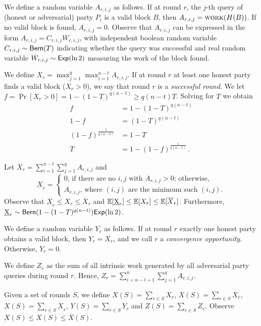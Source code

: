 We define a random variable $A_{r, i, j}$ as follows.
If at round $r$, the $j$-th query of (honest or adversarial) party $P_i$ is a valid block $B$,
then $A_{r, i, j} = \textsc{work}(H(B))$.
If no valid block is found, $A_{r, i, j} = 0$.
Observe that $A_{r, i, j}$ can be expressed in the form $A_{r, i, j} = C_{r, i, j} W_{r, i, j}$,
with independent boolean random variable $C_{r, i, j} \sim \textsf{Bern}(T)$ indicating whether the query was successful
and real random variable $W_{r, i, j} \sim \textsf{Exp}(\ln2)$ measuring the work of the block found.

We define $X_{r} = \max_{j=1}^q \max_{i = 1}^{n - t} A_{r, i, j}$.
If at round $r$ at least one honest party finds a valid block ($X_r > 0$),
we say that round $r$ is a \emph{successful round}.
We let $f = \Pr[X_r > 0] = 1 - (1 - T)^{q(n - t)} \geq q(n - t)T$.
Solving for $T$ we obtain
\begin{align*}
  f &= 1 - (1 - T)^{q(n - t)}\\
  1 - f &= (1 - T)^{q(n - t)}\\
  (1 - f)^{\frac{1}{q(n - t)}} &= 1 - T\\
  T &= 1 - (1 - f)^{\frac{1}{q(n - t)}}\,.
\end{align*}

Let $\overline{X}_r = \sum_{i = 1}^{n - t} \sum_{j = 1}^q A_{r,i,j}$ and
\[
  \underbar{X}_r = \begin{cases}
  0 \text{, if there are no $i, j$ with $A_{r,i,j} > 0$; otherwise,}\\
  A_{r,i,j} \text{, where $(i, j)$ are the minimum such $(i, j)$.}
\end{cases}\]
Observe that $\underbar{X}_r \leq X_r \leq \overline{X}_r$
and $\mathop{{}\mathbb{E}}[\underbar{X}_r] \leq \mathop{{}\mathbb{E}}[X_r] \leq \mathop{{}\mathbb{E}}[\overline{X}_r]$.
Furthermore, $\underbar{X}_r \sim \textsf{Bern}(1 - (1 - T)^{q(n - t)}) \textsf{Exp}(\ln 2)$.

We define a random variable $Y_r$ as follows.
If at round $r$ exactly one honest party obtains a valid block, then $Y_r = X_r$,
and we call $r$ a \emph{convergence opportunity}. Otherwise, $Y_r = 0$.

We define $Z_{r}$ as the sum of all intrinsic work generated by all adversarial
party queries during round $r$. Hence, $Z_{r} = \sum_{i = n - t + 1}^n \sum_{j = 1}^q A_{r, i, j}$.

Given a set of rounds $S$, we define
$X(S) = \sum_{r \in S} X_r$,
$\overline{X}(S) = \sum_{r \in S} \overline{X}_r$,
$\underbar{X}(S) = \sum_{r \in S} \underbar{X}_r$,
$Y(S) = \sum_{r \in S} Y_r$
and $Z(S) = \sum_{r \in S} Z_r$.
Observe $\underbar{X}(S) \leq X(S) \leq \overline{X}(S)$.

